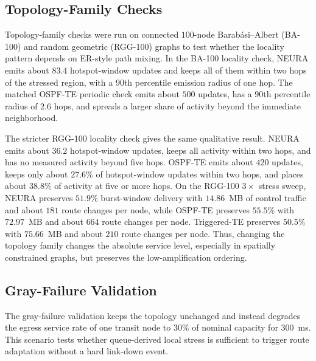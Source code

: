\documentclass[5p,times]{elsarticle}
\begin{document}
\subsection{Topology-Family Checks}

Topology-family checks were run on connected $100$-node Barab\'asi--Albert (BA-100) and random geometric (RGG-100) graphs to test whether the locality pattern depends on ER-style path mixing. In the BA-100 locality check, NEURA emits about $83.4$ hotspot-window updates and keeps all of them within two hops of the stressed region, with a $90$th percentile emission radius of one hop. The matched OSPF-TE periodic check emits about $500$ updates, has a $90$th percentile radius of $2.6$ hops, and spreads a larger share of activity beyond the immediate neighborhood.

The stricter RGG-100 locality check gives the same qualitative result. NEURA emits about $36.2$ hotspot-window updates, keeps all activity within two hops, and has no measured activity beyond five hops. OSPF-TE emits about $420$ updates, keeps only about $27.6\%$ of hotspot-window updates within two hops, and places about $38.8\%$ of activity at five or more hops. On the RGG-100 $3\times$ stress sweep, NEURA preserves $51.9\%$ burst-window delivery with $14.86$~MB of control traffic and about $181$ route changes per node, while OSPF-TE preserves $55.5\%$ with $72.97$~MB and about $664$ route changes per node. Triggered-TE preserves $50.5\%$ with $75.66$~MB and about $210$ route changes per node. Thus, changing the topology family changes the absolute service level, especially in spatially constrained graphs, but preserves the low-amplification ordering.

\subsection{Gray-Failure Validation}

The gray-failure validation keeps the topology unchanged and instead degrades the egress service rate of one transit node to $30\%$ of nominal capacity for $300$~ms. This scenario tests whether queue-derived local stress is sufficient to trigger route adaptation without a hard link-down event.
\end{document}
